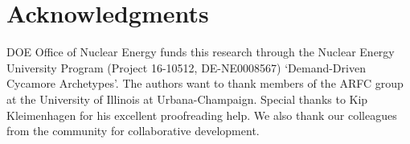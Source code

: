 \section{Acknowledgments}
\gls{DOE} Office of Nuclear Energy funds this research through 
the  Nuclear Energy University Program (Project 16-10512, DE-NE0008567) 
`Demand-Driven Cycamore Archetypes'. The authors want to thank 
members of the \gls{ARFC} group at the University of Illinois at 
Urbana-Champaign. 
Special thanks to Kip Kleimenhagen for his excellent proofreading 
help. 
We also thank our colleagues from the \Cyclus community
for collaborative \Cyclus development.